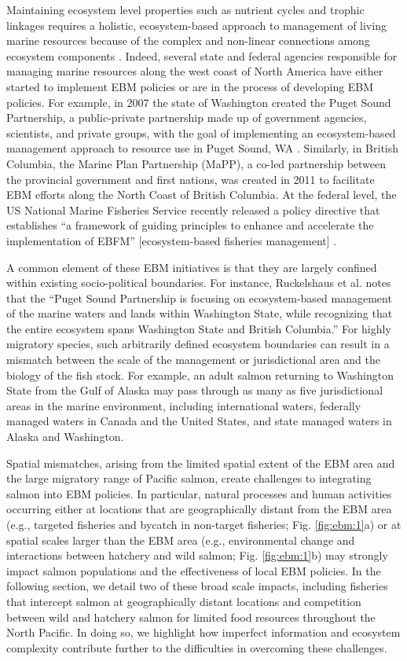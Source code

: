 Maintaining ecosystem level properties such as nutrient cycles and
trophic linkages requires a holistic, ecosystem-based approach to
management of living marine resources because of the complex and
non-linear connections among ecosystem components \citep{Engler2015}.
Indeed, several state and federal agencies responsible for managing
marine resources along the west coast of North America have either
started to implement EBM policies or are in the process of developing
EBM policies. For example, in 2007 the state of Washington created the
Puget Sound Partnership, a public-private partnership made up of
government agencies, scientists, and private groups, with the goal of
implementing an ecosystem-based management approach to resource use in
Puget Sound, WA \citep{Ruckelshaus2009, Samhouri2011a}. Similarly, in
British Columbia, the Marine Plan Partnership (MaPP), a co-led
partnership between the provincial government and first nations, was
created in 2011 to facilitate EBM efforts along the North Coast of
British Columbia. At the federal level, the US National Marine Fisheries
Service recently released a policy directive that establishes ``a
framework of guiding principles to enhance and accelerate the
implementation of EBFM'' {[}ecosystem-based fisheries management{]}
\citep{NMFS2016}.

A common element of these EBM initiatives is that they are largely
confined within existing socio-political boundaries. For instance,
Ruckelshaus et al. \citet{Ruckelshaus2009} notes that the ``Puget Sound
Partnership is focusing on ecosystem-based management of the marine
waters and lands within Washington State, while recognizing that the
entire ecosystem spans Washington State and British Columbia.'' For
highly migratory species, such arbitrarily defined ecosystem boundaries
can result in a mismatch between the scale of the management or
jurisdictional area and the biology of the fish stock. For example, an
adult salmon returning to Washington State from the Gulf of Alaska may
pass through as many as five jurisdictional areas in the marine
environment, including international waters, federally managed waters in
Canada and the United States, and state managed waters in Alaska and
Washington.

Spatial mismatches, arising from the limited spatial extent of the EBM area and
the large migratory range of Pacific salmon, create challenges to integrating
salmon into EBM policies. In particular, natural processes and human activities
occurring either at locations that are geographically distant from the EBM area
(e.g., targeted fisheries and bycatch in non-target fisheries; Fig.
\ref{fig:ebm:1}a) or at spatial scales larger than the EBM area (e.g.,
environmental change and interactions between hatchery and wild salmon; Fig.
\ref{fig:ebm:1}b) may strongly impact salmon populations and the effectiveness
of local EBM policies. In the following section, we detail two of these broad
scale impacts, including fisheries that intercept salmon at geographically
distant locations and competition between wild and hatchery salmon for limited
food resources throughout the North Pacific. In doing so, we highlight how
imperfect information and ecosystem complexity contribute further to the
difficulties in overcoming these challenges.

